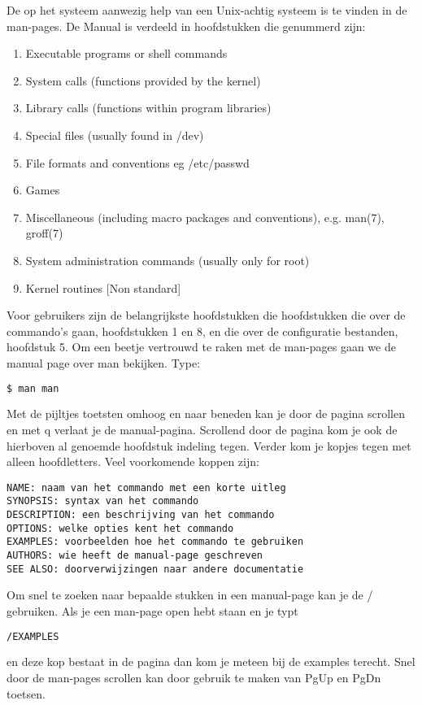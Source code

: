 De op het systeem aanwezig help van een Unix-achtig systeem is te vinden in de man-pages. De Manual is verdeeld in hoofdstukken die genummerd zijn:
\begin{enumerate}
\item Executable programs or shell commands
\item System calls (functions provided by the kernel)
\item Library calls (functions within program libraries)
\item Special files (usually found in /dev)
\item File formats and conventions eg /etc/passwd
\item Games
\item Miscellaneous (including macro packages and conventions), e.g. man(7), groff(7)
\item System administration commands (usually only for root)
\item Kernel routines [Non standard]
\end{enumerate}

Voor gebruikers zijn de belangrijkste hoofdstukken die hoofdstukken die over de commando's gaan, hoofdstukken 1 en 8, en die over de configuratie bestanden, hoofdstuk 5. Om een beetje vertrouwd te raken met de man-pages gaan we de manual page over man bekijken. Type:

\begin{lstlisting}[language=bash]
$ man man
\end{lstlisting}

Met de pijltjes toetsten omhoog en naar beneden kan je door de pagina scrollen en met q verlaat je de manual-pagina. Scrollend door de pagina kom je ook de hierboven al genoemde hoofdstuk indeling tegen. Verder kom je kopjes tegen met alleen hoofdletters. Veel voorkomende koppen zijn:

\begin{verbatim}
NAME: naam van het commando met een korte uitleg
SYNOPSIS: syntax van het commando
DESCRIPTION: een beschrijving van het commando
OPTIONS: welke opties kent het commando
EXAMPLES: voorbeelden hoe het commando te gebruiken
AUTHORS: wie heeft de manual-page geschreven
SEE ALSO: doorverwijzingen naar andere documentatie
\end{verbatim}

Om snel te zoeken naar bepaalde stukken in een manual-page kan je de / gebruiken. Als je een man-page open hebt staan en je typt

\begin{lstlisting}[language=bash]
/EXAMPLES
\end{lstlisting}

en deze kop bestaat in de pagina dan kom je meteen bij de examples terecht. Snel door de man-pages scrollen kan door gebruik te maken van PgUp en PgDn toetsen.

